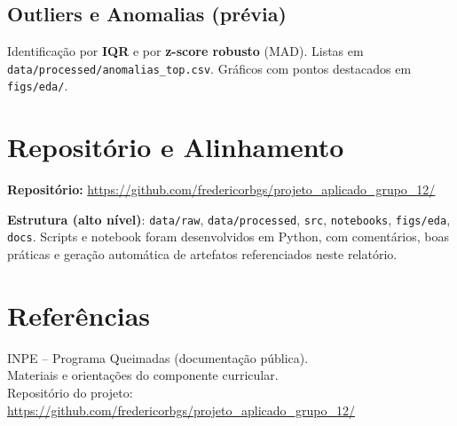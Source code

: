 \documentclass[12pt,a4paper]{report}
\newcommand{\repositorio}{\url{https://github.com/fredericorbgs/projeto_aplicado_grupo_12/}}
\begin{document}
\section{Outliers e Anomalias (prévia)}
Identificação por \textbf{IQR} e por \textbf{z-score robusto} (MAD). Listas em \texttt{data/processed/anomalias\_top.csv}. Gráficos com pontos destacados em \texttt{figs/eda/}.

\chapter{Repositório e Alinhamento}

\noindent \textbf{Repositório:} \repositorio

\noindent\textbf{Estrutura (alto nível)}: \texttt{data/raw}, \texttt{data/processed}, \texttt{src}, \texttt{notebooks}, \texttt{figs/eda}, \texttt{docs}.  
Scripts e notebook foram desenvolvidos em Python, com comentários, boas práticas e geração automática de artefatos referenciados neste relatório.

\chapter*{Referências}
INPE -- Programa Queimadas (documentação pública).\\
Materiais e orientações do componente curricular.\\
Repositório do projeto: \repositorio
\end{document}
